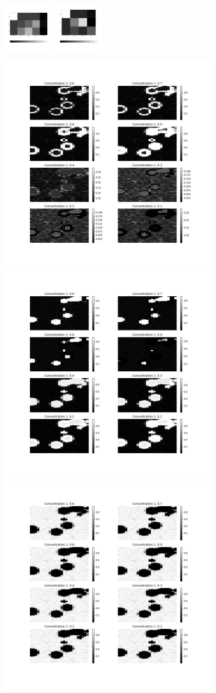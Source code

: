 \documentclass{article}
\begin{document}
\begin{figure}
  \includegraphics[width=0.23\textwidth]{figures/raman_sim_3_encode_layer_2_finetune_13.png}
  \includegraphics[width=0.23\textwidth]{figures/raman_sim_3_encode_layer_3_finetune_13.png}
\end{figure}


\begin{figure}
  \includegraphics[width=0.30\linewidth]{figures/prop_substance_1_im.png}
  \includegraphics[width=0.30\linewidth]{figures/prop_substance_2_im.png}
  \includegraphics[width=0.30\linewidth]{figures/prop_substance_3_im.png}
\end{figure}
\end{document}
